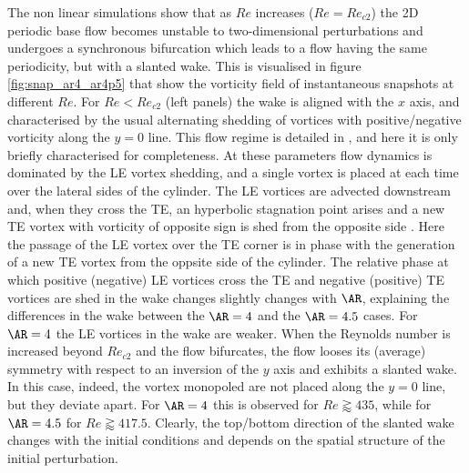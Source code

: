  The non linear simulations show that as $Re$ increases ($Re = Re_{c2}$) the 2D periodic base flow becomes unstable to two-dimensional perturbations and undergoes a synchronous bifurcation which leads to a flow having the same periodicity, but with a slanted wake. This is visualised in figure \ref{fig:snap_ar4_ar4p5} that show the vorticity field of instantaneous snapshots at different $Re$. For $Re< Re_{c2}$ (left panels) the wake is aligned with the $x$ axis, and characterised by the usual alternating shedding of vortices with positive/negative vorticity along the $y=0$ line. This flow regime is detailed in \cite{chiarini-quadrio-auteri-2022}, and here it is only briefly characterised for completeness. At these parameters flow dynamics is dominated by the LE vortex shedding, and a single vortex is placed at each time over the lateral sides of the cylinder. The LE vortices are advected downstream and, when they cross the TE, an hyperbolic stagnation point arises and a new TE vortex with vorticity of opposite sign is shed from the opposite side \citep{chiarini-quadrio-auteri-2022}. Here the passage of the LE vortex over the TE corner is in phase with the generation of a new TE vortex from the oppsite side of the cylinder. The relative phase at which positive (negative) LE vortices cross the TE and negative (positive) TE vortices are shed in the wake changes slightly changes with $\AR$, explaining the differences in the wake between the $\AR=4$ and the $\AR=4.5$ cases. For $\AR=4$ the LE vortices in the wake are weaker. When the Reynolds number is increased beyond $Re_{c2}$ and the flow bifurcates, the flow looses its (average) symmetry with respect to an inversion of the $y$ axis and exhibits a slanted wake. In this case, indeed, the vortex monopoled are not placed along the $y=0$ line, but they deviate apart. For $\AR=4$ this is observed for $Re \gtrapprox 435$, while for $\AR=4.5$ for $Re \gtrapprox 417.5$. Clearly, the top/bottom direction of the slanted wake changes with the initial conditions and depends on the spatial structure of the initial perturbation.

